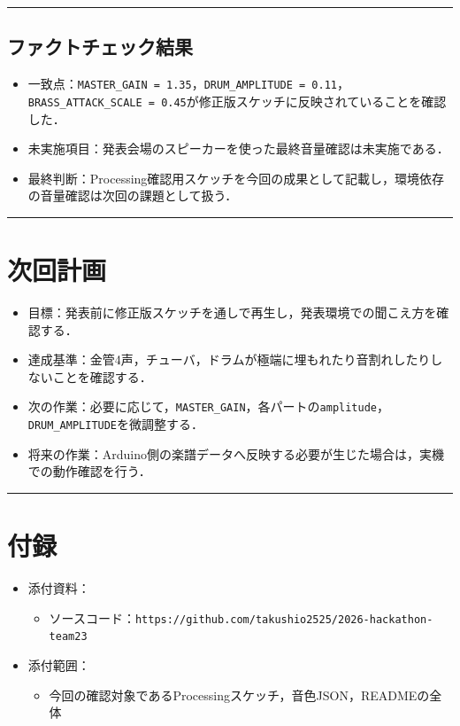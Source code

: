 \documentclass[uplatex,dvipdfmx,a4paper,11pt]{jsarticle}
\newcommand{\sectionrule}{\par\medskip\noindent\rule{\linewidth}{0.6pt}\par\medskip}
\begin{document}
\sectionrule

\subsection{ファクトチェック結果}

\begin{itemize}
  \item 一致点：\texttt{MASTER\_GAIN = 1.35}，\texttt{DRUM\_AMPLITUDE = 0.11}，\texttt{BRASS\_ATTACK\_SCALE = 0.45}が修正版スケッチに反映されていることを確認した．
  \item 未実施項目：発表会場のスピーカーを使った最終音量確認は未実施である．
  \item 最終判断：Processing確認用スケッチを今回の成果として記載し，環境依存の音量確認は次回の課題として扱う．
\end{itemize}

\sectionrule

\section{次回計画}

\begin{itemize}
  \item 目標：発表前に修正版スケッチを通しで再生し，発表環境での聞こえ方を確認する．
  \item 達成基準：金管4声，チューバ，ドラムが極端に埋もれたり音割れしたりしないことを確認する．
  \item 次の作業：必要に応じて，\texttt{MASTER\_GAIN}，各パートの\texttt{amplitude}，\texttt{DRUM\_AMPLITUDE}を微調整する．
  \item 将来の作業：Arduino側の楽譜データへ反映する必要が生じた場合は，実機での動作確認を行う．
\end{itemize}

\sectionrule

\section{付録}

\begin{itemize}
  \item 添付資料：
    \begin{itemize}
      \item ソースコード：\texttt{https://github.com/takushio2525/2026-hackathon-team23}
    \end{itemize}
  \item 添付範囲：
    \begin{itemize}
      \item 今回の確認対象であるProcessingスケッチ，音色JSON，READMEの全体
    \end{itemize}
\end{itemize}
\end{document}
